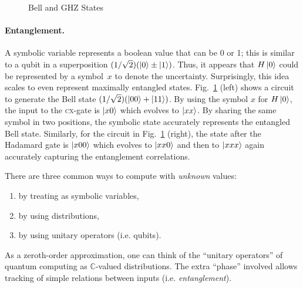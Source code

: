 \documentclass[sigplan]{acmart}
\newcommand{\cx}{\textsc{cx}}
\newcommand{\Cplx}{\ensuremath{\mathbb{C}}}
\begin{document}
\begin{figure}[ht]
\begin{center}
\qquad
{}
\end{center}
\caption{\label{fig:bell2}Bell and GHZ States}
\end{figure}
\paragraph*{Entanglement.}
A symbolic variable represents a boolean value that can be 0 or 1;
this is similar to a qubit in a superposition $(1/\sqrt{2}) (\ket{0}
\pm \ket{1})$. Thus, it appears that $H\ket{0}$ could be represented
by a symbol~$x$ to denote the uncertainty. Surprisingly, this idea
scales to even represent maximally entangled
states. Fig.~\ref{fig:bell2} (left) shows a circuit to generate the Bell
state $(1/\sqrt{2}) (\ket{00} + \ket{11})$. By using the symbol $x$
for $H\ket{0}$, the input to the \cx-gate is $\ket{x0}$ which
evolves to $\ket{xx}$. By sharing the same symbol in two positions,
the symbolic state accurately represents the entangled Bell
state. Similarly, for the circuit in Fig.~\ref{fig:bell2} (right), the
state after the Hadamard gate is $\ket{x00}$ which evolves to
$\ket{xx0}$ and then to $\ket{xxx}$ again accurately capturing the
entanglement correlations.

\newpage




There are three common ways to compute with \emph{unknown} values:
\begin{enumerate}
  \item by treating as symbolic variables,
  \item by using distributions,
  \item by using unitary operators (i.e. qubits).
\end{enumerate}
As a zeroth-order approximation, one can think of the ``unitary operators'' of quantum
computing as \Cplx-valued distributions. The extra ``phase'' involved allows tracking of
simple relations between inputs (i.e. \emph{entanglement}).
\end{document}
